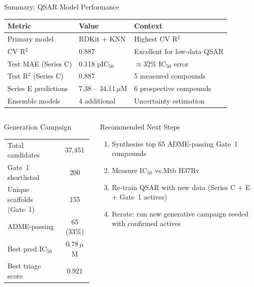 \documentclass[aspectratio=169]{beamer}
\begin{document}
\begin{frame}{Summary: QSAR Model Performance}
  \centering
  \small
  \begin{tabular}{lll}
    \toprule
    \textbf{Metric} & \textbf{Value} & \textbf{Context} \\
    \midrule
    Primary model          & RDKit + KNN     & Highest CV R$^2$ \\
    CV R$^2$               & 0.887           & Excellent for low-data QSAR \\
    Test MAE (Series C)    & 0.118 pIC$_{50}$ & $\approx$32\% IC$_{50}$ error \\
    Test R$^2$ (Series C)  & 0.887           & 5 measured compounds \\
    Series E predictions   & 7.38 -- 34.11\,$\mu$M & 6 prospective compounds \\
    Ensemble models        & 4 additional    & Uncertainty estimation \\
    \bottomrule
  \end{tabular}
  \vspace{0.5em}

  \begin{columns}
    \begin{block}{Generation Campaign}
      \small
      \begin{tabular}{lc}
        Total candidates   & 37,451 \\
        Gate~1 shortlisted & 200 \\
        Unique scaffolds (Gate~1) & 155 \\
        ADME-passing       & 65 (33\%) \\
        Best pred IC$_{50}$ & 0.78\,$\mu$M \\
        Best triage score  & 0.921 \\
      \end{tabular}
    \end{block}
    \begin{alertblock}{Recommended Next Steps}
      \small
      \begin{enumerate}
        \item Synthesise top 65 ADME-passing Gate~1 compounds
        \item Measure IC$_{50}$ vs.\@ Mtb H37Rv
        \item Re-train QSAR with new data (Series C + E + Gate~1 actives)
        \item Iterate: run new generative campaign seeded with confirmed actives
      \end{enumerate}
    \end{alertblock}
  \end{columns}
\end{frame}
\end{document}
